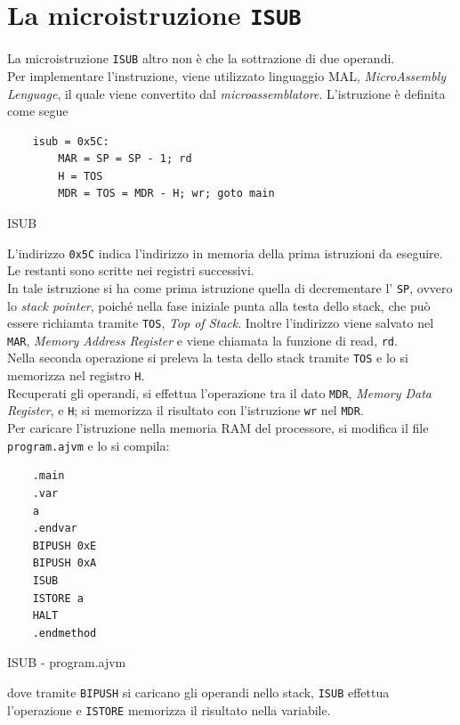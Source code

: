 \section{La microistruzione \texttt{ISUB}}
La microistruzione \texttt{ISUB} altro non è che la sottrazione di due operandi.\\
Per implementare l'instruzione, viene utilizzato linguaggio MAL, \textit{MicroAssembly Lenguage}, il quale viene convertito dal \textit{microassemblatore}.
L'istruzione è definita come segue
\begin{listing}[H]
    \begin{verbatim}
    isub = 0x5C:
        MAR = SP = SP - 1; rd
        H = TOS
        MDR = TOS = MDR - H; wr; goto main
    \end{verbatim}
    \caption{ISUB}
\end{listing}
L'indirizzo \texttt{0x5C} indica l'indirizzo in memoria della prima istruzioni da eseguire. Le restanti sono scritte nei registri successivi. \\
In tale istruzione si ha come prima istruzione quella di decrementare l' \texttt{SP}, ovvero lo \textit{stack pointer}, poiché nella fase iniziale punta alla testa dello stack, che può essere richiamta tramite \texttt{TOS}, \textit{Top of Stack}.
Inoltre l'indirizzo viene salvato nel \texttt{MAR}, \textit{Memory Address Register} e viene chiamata la funzione di read, \texttt{rd}.\\
Nella seconda operazione si preleva la testa dello stack tramite \texttt{TOS} e lo si memorizza nel registro \texttt{H}. \\
Recuperati gli operandi, si effettua l'operazione tra il dato \texttt{MDR}, \textit{Memory Data Register}, e \texttt{H}; si memorizza il risultato con l'istruzione \texttt{wr} nel \texttt{MDR}.\\
Per caricare l'istruzione nella memoria RAM del processore, si modifica il file \texttt{program.ajvm} e lo si compila:
\begin{listing}[H]
    \begin{verbatim}
    .main
    .var
    a
    .endvar
    BIPUSH 0xE
    BIPUSH 0xA
    ISUB
    ISTORE a
    HALT
    .endmethod
    \end{verbatim}
    \caption{ISUB - program.ajvm}
\end{listing}
dove tramite \texttt{BIPUSH} si caricano gli operandi nello stack, \texttt{ISUB} effettua l'operazione e \texttt{ISTORE} memorizza il risultato nella variabile.

